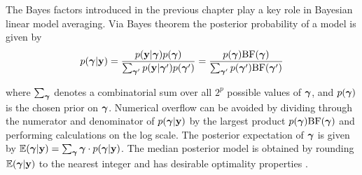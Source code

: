 






The Bayes factors introduced in the previous chapter play a key role in
Bayesian linear model averaging.  Via Bayes theorem the posterior probability
of a model is given by
$$
\displaystyle p({\boldsymbol \gamma}|{\bf y}) = \frac{p({\bf y}|{\boldsymbol \gamma})p({\boldsymbol \gamma})}{\sum_{{\boldsymbol \gamma}'} p({\bf y}|{\boldsymbol \gamma}')p({\boldsymbol \gamma}')} = \frac{p({\boldsymbol \gamma})\mbox{BF}({\boldsymbol \gamma})}{\sum_{{\boldsymbol \gamma}'} p({\boldsymbol \gamma}')\mbox{BF}({\boldsymbol \gamma}')}
$$

\noindent where $\sum_{{\boldsymbol \gamma}}$ denotes a combinatorial sum over all $2^p$
possible values of ${\boldsymbol \gamma}$, and $p({\boldsymbol \gamma})$ is the chosen prior on
${\boldsymbol \gamma}$. Numerical overflow can be avoided by dividing through the numerator
and denominator of $p({\boldsymbol \gamma}|{\bf y})$ by the largest product
$p({\boldsymbol \gamma})\mbox{BF}({\boldsymbol \gamma})$ and performing calculations  on the log scale.
The posterior expectation of ${\boldsymbol \gamma}$ is given by ${\mathbb E}({\boldsymbol \gamma}|{\bf y}) =
\sum_{{\boldsymbol \gamma}} {\boldsymbol \gamma} \cdot p({\boldsymbol \gamma}|{\bf y})$.  The median posterior model  is
obtained by rounding ${\mathbb E}({\boldsymbol \gamma}|{\bf y})$ to the nearest integer and has
desirable optimality properties \citep{Barbieri2004}.
 
